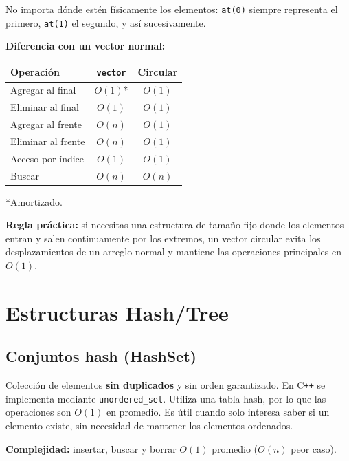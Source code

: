 \documentclass[10pt,a4paper,twocolumn]{article}
\begin{document}
No importa dónde estén físicamente los elementos: \texttt{at(0)} siempre
representa el primero, \texttt{at(1)} el segundo, y así sucesivamente.

\textbf{Diferencia con un vector normal:}

\begin{center}
\small
\begin{tabular}{|l|c|c|}
\hline
\textbf{Operación} & \texttt{vector} & \textbf{Circular} \\
\hline
Agregar al final & $O(1)$* & $O(1)$ \\
\hline
Eliminar al final & $O(1)$ & $O(1)$ \\
\hline
Agregar al frente & $O(n)$ & $O(1)$ \\
\hline
Eliminar al frente & $O(n)$ & $O(1)$ \\
\hline
Acceso por índice & $O(1)$ & $O(1)$ \\
\hline
Buscar & $O(n)$ & $O(n)$ \\
\hline
\end{tabular}
\end{center}

\noindent
*Amortizado.

\textbf{Regla práctica:} si necesitas una estructura de tamaño fijo
donde los elementos entran y salen continuamente por los extremos,
un vector circular evita los desplazamientos de un arreglo normal y
mantiene las operaciones principales en $O(1)$.

\section{Estructuras Hash/Tree}


\subsection{Conjuntos hash (HashSet)}

Colección de elementos \textbf{sin duplicados} y sin orden garantizado.
En C\texttt{++} se implementa mediante \texttt{unordered\_set}. Utiliza
una tabla hash, por lo que las operaciones son $O(1)$ en promedio.
Es útil cuando solo interesa saber si un elemento existe, sin necesidad
de mantener los elementos ordenados.

\textbf{Complejidad:} insertar, buscar y borrar $O(1)$ promedio
($O(n)$ peor caso).
\end{document}
